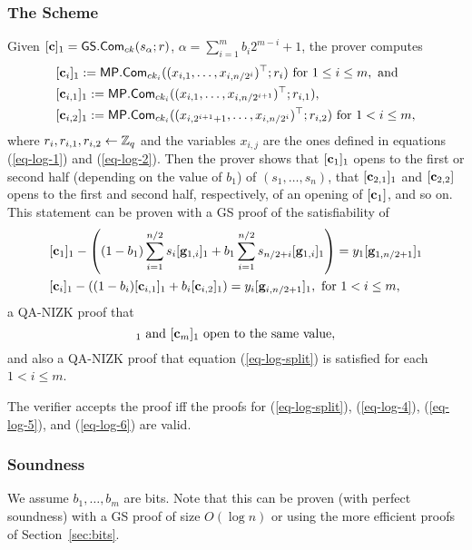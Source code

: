\subsubsection{The Scheme}
Given $[\mathbf{c}]_1={\mathsf{GS}}.\mathsf{Com}_{ck}(s_\alpha;r)$, $\alpha=\sum_{i=1}^{m}b_i2^{m-i}+1$, the prover computes
\begin{align*}
&[\mathbf{c}_i]_1:=\mathsf{MP}.\mathsf{Com}_{ck_i}((x_{i,1},\ldots,x_{i,n/2^i})^\top;r_i) \text{ for } 1\leq i \leq m, \text{ and}\\
&[\mathbf{c}_{i,1}]_1:=\mathsf{MP}.\mathsf{Com}_{ck_i}((x_{i,1},\ldots,x_{i,n/2^{i+1}})^\top;r_{i,1}),\\
&[\mathbf{c}_{i,2}]_1:=\mathsf{MP}.\mathsf{Com}_{ck_i}((x_{i,2^{i+1}+1},\ldots, x_{i,n/2^i})^\top;r_{i,2})\text{ for }1 < i \leq m,
\end{align*}
where $r_i,r_{i,1},r_{i,2}\gets\mathbb{Z}_q$ and the variables $x_{i,j}$ are the ones defined in equations (\ref{eq-log-1}) and (\ref{eq-log-2}). Then the prover shows that
$[\mathbf{c}_1]_1$ opens to the first or second half (depending on the value of $b_1$) of $(s_1,\ldots,s_n)$, that $[\mathbf{c}_{2,1}]_1$ and $[\mathbf{c}_{2,2}]$ opens to the first and second half, respectively, of an opening of $[\mathbf{c}_{1}]$, and so on. This statement can be proven with a GS proof of
 the satisfiability of
\begin{align}
&[\mathbf{c}_1]_1-\left((1-b_1)\sum_{i=1}^{n/2}s_i[\mathbf{g}_{1,i}]_1 + b_1\sum_{i=1}^{n/2} s_{n/2+i}[\mathbf{g}_{1,i}]_1\right) = y_1[\mathbf{g}_{1,n/2+1}]_1 \label{eq-log-4}\\
&[\mathbf{c}_i]_1-\left((1-b_i)[\mathbf{c}_{i,1}]_1+b_i[\mathbf{c}_{i,2}]_1\right) = y_i[\mathbf{g}_{i,n/2+1}]_1, \text{ for } 1 < i \leq m,  \label{eq-log-5}
\end{align}
a QA-NIZK proof that
\begin{equation}
[\vecb{c}]_1\text{ and }[\vecb{c}_m]_1\text{ open to the same value}, \label{eq-log-6}
\end{equation}
and also a QA-NIZK proof that equation (\ref{eq-log-split}) is satisfied for each $1<i\leq m$.

The verifier accepts the proof iff the proofs for (\ref{eq-log-split}), (\ref{eq-log-4}), (\ref{eq-log-5}), and (\ref{eq-log-6}) are valid.

\subsubsection{Soundness}
We assume $b_1,\ldots,b_m$ are bits. Note that this can be proven (with perfect soundness) with a GS proof of size $O(\log n)$ or using the more efficient proofs of Section~\ref{sec:bits}.

